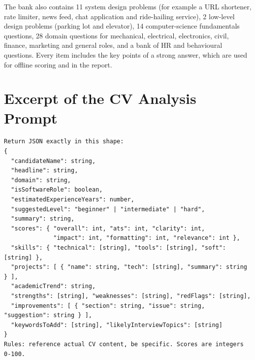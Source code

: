 \documentclass[12pt,a4paper,oneside]{report}
\begin{document}
The bank also contains 11 system design problems (for example a URL shortener, rate limiter, news feed, chat application and ride-hailing service), 2 low-level design problems (parking lot and elevator), 14 computer-science fundamentals questions, 28 domain questions for mechanical, electrical, electronics, civil, finance, marketing and general roles, and a bank of HR and behavioural questions. Every item includes the key points of a strong answer, which are used for offline scoring and in the report.

\chapter{Excerpt of the CV Analysis Prompt}
\begin{lstlisting}[language={},caption={Output schema requested for CV analysis (excerpt)},label={lst:prompt}]
Return JSON exactly in this shape:
{
  "candidateName": string,
  "headline": string,
  "domain": string,
  "isSoftwareRole": boolean,
  "estimatedExperienceYears": number,
  "suggestedLevel": "beginner" | "intermediate" | "hard",
  "summary": string,
  "scores": { "overall": int, "ats": int, "clarity": int,
              "impact": int, "formatting": int, "relevance": int },
  "skills": { "technical": [string], "tools": [string], "soft": [string] },
  "projects": [ { "name": string, "tech": [string], "summary": string } ],
  "academicTrend": string,
  "strengths": [string], "weaknesses": [string], "redFlags": [string],
  "improvements": [ { "section": string, "issue": string, "suggestion": string } ],
  "keywordsToAdd": [string], "likelyInterviewTopics": [string]
}
Rules: reference actual CV content, be specific. Scores are integers 0-100.
\end{lstlisting}
\end{document}
